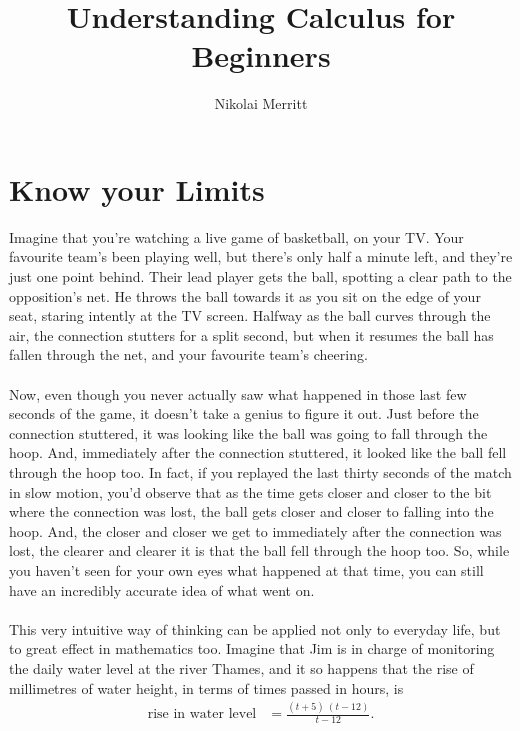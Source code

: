 \documentclass[11pt]{article}
\author{Nikolai Merritt}
\title{Understanding Calculus for Beginners}
\date{\vspace{-5ex}}
\numberwithin{equation}{section}
\begin{document}
\newcommand{\D}[2]{\frac{\textrm{d}#1}{\textrm{d}#2}}
\maketitle

\newpage
\tableofcontents

\newpage
\section{Know your Limits}
Imagine that you're watching a live game of basketball, on your TV. Your favourite team's been playing well, but there's only half a minute left, and they're just one point behind. Their lead player gets the ball, spotting a clear path to the opposition's net. He throws the ball towards it as you sit on the edge of your seat, staring intently at the TV screen. Halfway as the ball curves through the air, the connection stutters for a split second, but when it resumes the ball has fallen through the net, and your favourite team's cheering. 
\\ \\
Now, even though you never actually saw what happened in those last few seconds of the game, it doesn't take a genius to figure it out. Just before the connection stuttered, it was looking like the ball was going to fall through the hoop. And, immediately after the connection stuttered, it looked like the ball fell through the hoop too. In fact, if you replayed the last thirty seconds of the match in slow motion, you'd observe that as the time gets closer and closer to the bit where the connection was lost, the ball gets closer and closer to falling into the hoop. And, the closer and closer we get to immediately after the connection was lost, the clearer and clearer it is that the ball fell through the hoop too. So, while you haven't seen for your own eyes what happened at that time, you can still have an incredibly accurate idea of what went on.  
\\ \\
This very intuitive way of thinking can be applied not only to everyday life, but to great effect in mathematics too. Imagine that Jim is in charge of monitoring the daily water level at the river Thames, and it so happens that the rise of millimetres of water height, in terms of times passed in hours, is
\begin{align*}
\textrm{rise in water level} &= \frac{(t + 5) \ (t - 12)}{t - 12}.
\end{align*}
\\ \\
\end{document}
